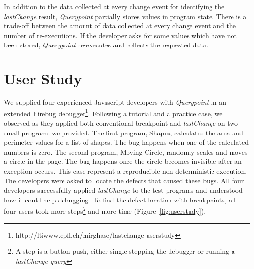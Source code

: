 \documentclass{sig-alternate}
\begin{document}
In addition to the data collected at every change event for identifying the \textit{lastChange}
result, \textit{Querypoint} partially stores values in program state. There is a trade-off between the amount of data collected at every change event and the number of re-executions. If the developer asks for some values which have not been stored, \textit{Querypoint} re-executes and collects the requested data. 


\section{User Study}
We supplied four experienced Javascript developers with \textit{Querypoint} in an 
extended Firebug debugger\footnote[1]{http://ltiwww.epfl.ch/\texttildelow mirghase/lastchange-userstudy}. Following a tutorial and a practice case, we observed as they 
applied both conventional breakpoint and \textit{lastChange} on two small programs we provided. The first program, Shapes, calculates the area and perimeter values for a list of shapes. The bug happens when one of the calculated numbers is zero. The second program, Moving Circle, randomly scales and moves a circle in the page. The bug happens once the circle becomes invisible after an exception occurs. This case represent a reproducible non-deterministic execution. The developers were asked to locate the defects that caused these bugs. All four developers successfully applied \textit{lastChange} to the test programs and understood how it could help debugging. To find the defect location with breakpoints, all four users took more steps\footnote[2]{A step is a button push, either single stepping the debugger or running a \textit{lastChange query}} and more time (Figure~\ref{fig:userstudy}).    


\end{document}
